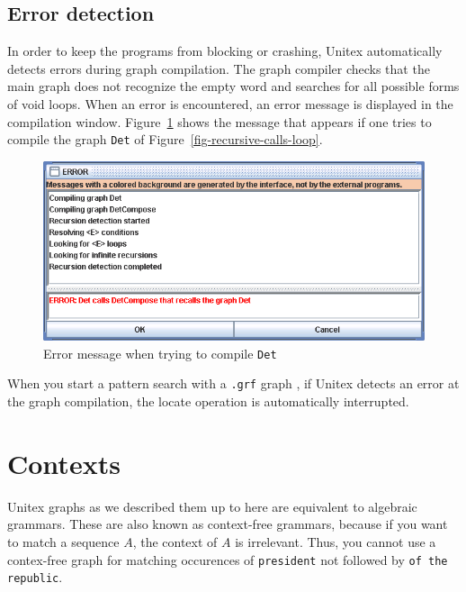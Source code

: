 \subsection{Error detection}
In order to keep the programs from blocking or crashing, Unitex automatically
detects errors during graph compilation. The graph compiler checks that the
main graph does not recognize the empty word and searches for all possible
forms of void loops. When an error is encountered, an error message is
displayed in the compilation window. Figure~\ref{fig-error-message} shows
the message that appears if one tries to compile the graph \verb+Det+ of
Figure~\ref{fig-recursive-calls-loop}.

\begin{figure}[!h]
\begin{center}
\includegraphics[width=15cm]{resources/img/fig6-11.png}
\caption{Error message when trying to compile
\texttt{Det}\label{fig-error-message}}
\end{center}
\end{figure}

\noindent When you start a pattern search with a \verb+.grf+
graph , if Unitex detects an error at the graph
compilation, the locate operation is automatically interrupted.


\section{Contexts}
\label{section-contexts}

Unitex graphs as we described them up to here are equivalent to algebraic
grammars. These are also known as context-free grammars, because if you want to
match a sequence $A$, the context of $A$ is irrelevant. Thus, you cannot use a
contex-free graph for matching occurences of \verb+president+ not followed by
\verb+of the republic+.

